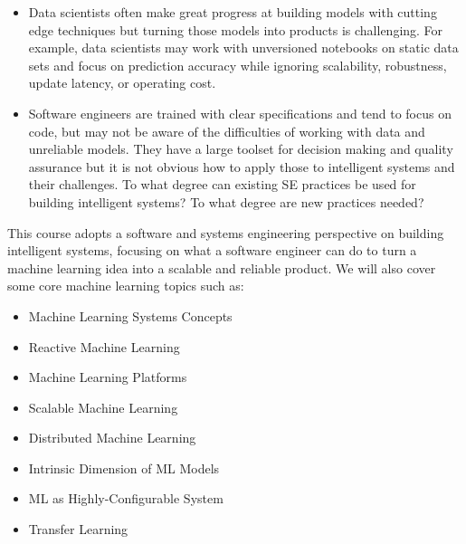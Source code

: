 \documentclass[11pt]{article}
\begin{document}
\begin{itemize}

\item Data scientists often make great progress at building models with cutting edge techniques but turning those models into products is challenging. For example, data scientists may work with unversioned notebooks on static data sets and focus on prediction accuracy while ignoring scalability, robustness, update latency, or operating cost.

\item Software engineers are trained with clear specifications and tend to focus on code, but may not be aware of the difficulties of working with data and unreliable models. They have a large toolset for decision making and quality assurance but it is not obvious how to apply those to intelligent systems and their challenges.
To what degree can existing SE practices be used for building intelligent systems? To what degree are new practices needed?
\end{itemize}

This course adopts a software and systems engineering perspective on building intelligent systems, focusing on what a software engineer can do to turn a machine learning idea into a scalable and reliable product. We will also cover some core machine learning topics such as:
\begin{itemize}
  \item Machine Learning Systems Concepts
  \item Reactive Machine Learning
  \item Machine Learning Platforms
  \item Scalable Machine Learning
  \item Distributed Machine Learning
  \item Intrinsic Dimension of ML Models
  \item ML as Highly-Configurable System
  \item Transfer Learning
\end{itemize}

\end{document}
